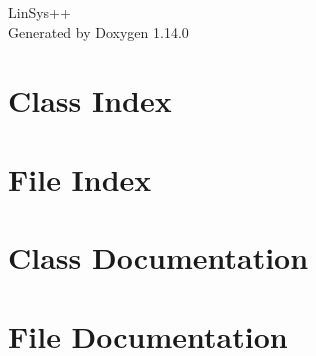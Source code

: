 \documentclass[twoside]{book}
\newcommand{\+}{\discretionary{\mbox{\scriptsize$\hookleftarrow$}}{}{}}
\newcommand{\clearemptydoublepage}{%
    \newpage{\pagestyle{empty}\cleardoublepage}%
  }
\begin{document}
  \raggedbottom
    \hypersetup{pageanchor=false,
                bookmarksnumbered=true,
                pdfencoding=unicode
               }
  \begin{titlepage}
  \vspace*{7cm}
  \begin{center}%
  {\Large Lin\+Sys++}\\
  \vspace*{1cm}
  {\large Generated by Doxygen 1.14.0}\\
  \end{center}
  \end{titlepage}
  \clearemptydoublepage
  \tableofcontents
  \clearemptydoublepage
  \hypersetup{pageanchor=true}

\chapter{Class Index}

\chapter{File Index}

\chapter{Class Documentation}

\chapter{File Documentation}













  \backmatter
  \newpage
  \clearemptydoublepage
  \printindex
\end{document}
